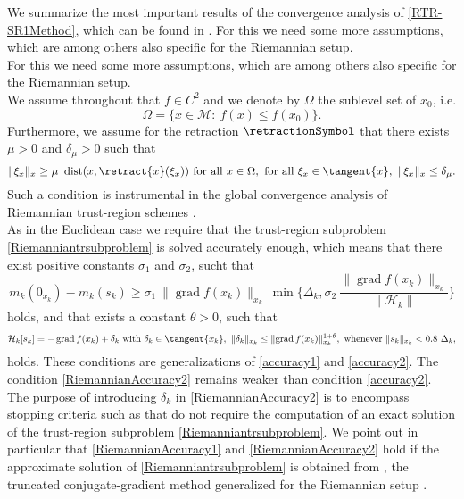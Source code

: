 We summarize the most important results of the convergence analysis of \cref{RTR-SR1Method}, which can be found in \cite{HuangAbsilGallivan:2014}. For this we need some more assumptions, which are among others also specific for the Riemannian setup. \\
For this we need some more assumptions, which are among others also specific for the Riemannian setup. \\
We assume throughout that $f \in C^2$ and we denote by $\Omega$ the sublevel set of $x_0$, i.e.
\begin{equation*}
    \Omega = \{ x \in \mathcal{M} \colon \ f(x) \leq f(x_0) \}.
\end{equation*}
Furthermore, we assume for the retraction $\retractionSymbol$ that there exists $\mu > 0$ and $\delta_{\mu} > 0$ such that
\begin{equation}\label{RetractionAssumption}
    \lVert \xi_x \rVert_x \geq \mu \ \operatorname{dist}(x, \retract{x}(\xi_x)) \text{ for all } x \in \Omega, \text{ for all } \xi_x \in \tangent{x}, \ \lVert \xi_x \rVert_x \leq \delta_{\mu}.
\end{equation}
Such a condition is instrumental in the global convergence analysis of Riemannian trust-region schemes \cite[p.~7]{HuangAbsilGallivan:2014}. \\
As in the Euclidean case we require that the trust-region subproblem \cref{Riemanniantrsubproblem} is solved accurately enough, which means that there exist positive constants $\sigma_1$ and $\sigma_2$, sucht that 
\begin{equation}\label{RiemannianAccuracy1}
    m_k(0_{x_k}) - m_k(s_k) \geq \sigma_1 \ \lVert \operatorname{grad} f(x_k) \rVert_{x_k} \ \min \{ \Delta_k, \sigma_2 \ \frac{\lVert \operatorname{grad} f(x_k) \rVert_{x_k}}{\lVert \mathcal{H}_k \rVert} \}
\end{equation} 
holds, and that exists a constant $\theta > 0$, such that 
\begin{equation}\label{RiemannianAccuracy2}
    \mathcal{H}_k [s_k] = - \operatorname{grad} f(x_k) + \delta_k \text{ with } \delta_k \in \tangent{x_k}, \ \lVert \delta_k \rVert_{x_k} \leq \lVert \operatorname{grad} f(x_k) \rVert^{1 + \theta}_{x_k}, \text{ whenever } \lVert s_k \rVert_{x_k} < 0.8 \ \Delta_k,
\end{equation}
holds. These conditions are generalizations of \cref{accuracy1} and \cref{accuracy2}. The condition \cref{RiemannianAccuracy2} remains weaker than condition \cref{accuracy2}. The purpose of introducing $\delta_k$ in \cref{RiemannianAccuracy2} is to encompass stopping criteria such as \cite[(7.10)]{AbsilMahonySepulchre:2008} that do not require the computation of an exact solution of the trust-region subproblem \cref{Riemanniantrsubproblem}. We point out in particular that \cref{RiemannianAccuracy1} and \cref{RiemannianAccuracy2} hold if the approximate solution of \cref{Riemanniantrsubproblem} is obtained from \cite[Algorithm~11]{AbsilMahonySepulchre:2008}, the truncated conjugate-gradient method generalized for the Riemannian setup \cite[p.~7]{HuangAbsilGallivan:2014}. \\
